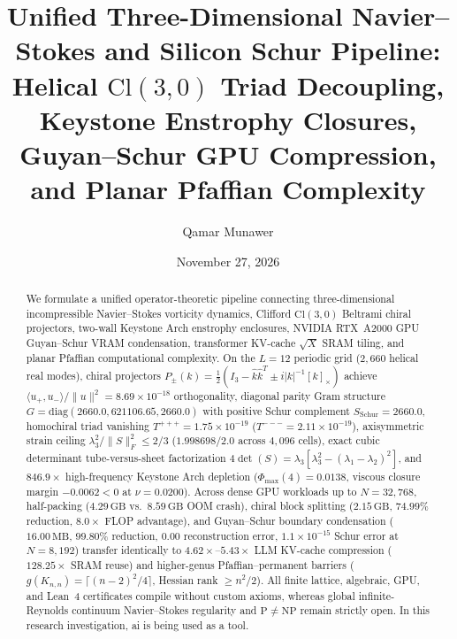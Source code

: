 \documentclass[10pt]{article}
\title{\bfseries Unified Three-Dimensional Navier--Stokes and Silicon Schur Pipeline:\\
Helical \texorpdfstring{$\mathrm{Cl}(3,0)$}{Cl(3,0)} Triad Decoupling, Keystone Enstrophy Closures, Guyan--Schur GPU Compression, and Planar Pfaffian Complexity}
\author{Qamar Munawer}
\date{November 27, 2026}
\renewcommand{\_}{\OrigUnderscore\hspace{0pt}}
\numberwithin{equation}{section}
\newcommand{\Cl}{\mathrm{Cl}}
\begin{document}
\maketitle

\begin{abstract}
We formulate a unified operator-theoretic pipeline connecting three-dimensional incompressible Navier--Stokes vorticity dynamics, Clifford $\Cl(3,0)$ Beltrami chiral projectors, two-wall Keystone Arch enstrophy enclosures, NVIDIA RTX~A2000 GPU Guyan--Schur VRAM condensation, transformer KV-cache $\sqrt{X}$ SRAM tiling, and planar Pfaffian computational complexity. On the $L=12$ periodic grid ($2{,}660$ helical real modes), chiral projectors $P_\pm(k) = \frac{1}{2}(I_3 - \hat{k}\hat{k}^T \pm i|k|^{-1}[k]_\times)$ achieve $\langle u_+, u_-\rangle/\|u\|^2 = 8.69\times 10^{-18}$ orthogonality, diagonal parity Gram structure $G = \mathrm{diag}(2660.0, 621106.65, 2660.0)$ with positive Schur complement $S_{\mathrm{Schur}} = 2660.0$, homochiral triad vanishing $T^{+++} = 1.75\times 10^{-19}$ ($T^{---} = 2.11\times 10^{-19}$), axisymmetric strain ceiling $\lambda_3^2/\|S\|_F^2 \le 2/3$ ($1.998698/2.0$ across $4{,}096$ cells), exact cubic determinant tube-versus-sheet factorization $4\det(S) = \lambda_3[\lambda_3^2 - (\lambda_1-\lambda_2)^2]$, and $846.9\times$ high-frequency Keystone Arch depletion ($\Phi_{\max}(4) = 0.0138$, viscous closure margin $-0.0062 < 0$ at $\nu = 0.0200$). Across dense GPU workloads up to $N = 32{,}768$, half-packing ($4.29\,\mathrm{GB}$ vs.\ $8.59\,\mathrm{GB}$ OOM crash), chiral block splitting ($2.15\,\mathrm{GB}$, $74.99\%$ reduction, $8.0\times$ FLOP advantage), and Guyan--Schur boundary condensation ($16.00\,\mathrm{MB}$, $99.80\%$ reduction, $0.00$ reconstruction error, $1.1\times 10^{-15}$ Schur error at $N=8{,}192$) transfer identically to $4.62\times\text{--}5.43\times$ LLM KV-cache compression ($128.25\times$ SRAM reuse) and higher-genus Pfaffian--permanent barriers ($g(K_{n,n}) = \lceil (n-2)^2/4\rceil$, Hessian rank $\ge n^2/2$). All finite lattice, algebraic, GPU, and Lean~4 certificates compile without custom axioms, whereas global infinite-Reynolds continuum Navier--Stokes regularity and $\mathrm{P} \neq \mathrm{NP}$ remain strictly open. In this research investigation, ai is being used as a tool.
\end{abstract}
\end{document}
